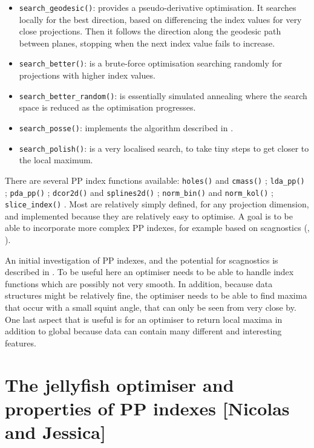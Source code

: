 \documentclass[
  number,
  preprint,
  3p]{elsarticle}
\providecommand{\tightlist}{%
  \setlength{\itemsep}{0pt}\setlength{\parskip}{0pt}}\usepackage{longtable,booktabs,array}
\begin{document}
\begin{itemize}
\tightlist
\item
  \texttt{search\_geodesic()}: provides a pseudo-derivative
  optimisation. It searches locally for the best direction, based on
  differencing the index values for very close projections. Then it
  follows the direction along the geodesic path between planes, stopping
  when the next index value fails to increase.
\item
  \texttt{search\_better()}: is a brute-force optimisation searching
  randomly for projections with higher index values.
\item
  \texttt{search\_better\_random()}: is essentially simulated annealing
  \citep{Bertsimas93} where the search space is reduced as the
  optimisation progresses.
\item
  \texttt{search\_posse()}: implements the algorithm described in
  \citet{posse95}.
\item
  \texttt{search\_polish()}: is a very localised search, to take tiny
  steps to get closer to the local maximum.
\end{itemize}

There are several PP index functions available: \texttt{holes()} and
\texttt{cmass()} \citep{cook1993projection}; \texttt{lda\_pp()}
\citep{lee2005projection}; \texttt{pda\_pp()} \citep{lee2010projection};
\texttt{dcor2d()} and \texttt{splines2d()} \citep{Grimm2016};
\texttt{norm\_bin()} and \texttt{norm\_kol()} \citep{huber85};
\texttt{slice\_index()} \citep{Laa:2020wkm}. Most are relatively simply
defined, for any projection dimension, and implemented because they are
relatively easy to optimise. A goal is to be able to incorporate more
complex PP indexes, for example based on scagnostics (\citet{scag},
\citet{WW08}).

An initial investigation of PP indexes, and the potential for
scagnostics is described in \citet{laa_using_2020}. To be useful here an
optimiser needs to be able to handle index functions which are possibly
not very smooth. In addition, because data structures might be
relatively fine, the optimiser needs to be able to find maxima that
occur with a small squint angle, that can only be seen from very close
by. One last aspect that is useful is for an optimiser to return local
maxima in addition to global because data can contain many different and
interesting features.

\section{The jellyfish optimiser and properties of PP indexes {[}Nicolas
and Jessica{]}}\label{sec-theory}
\end{document}
